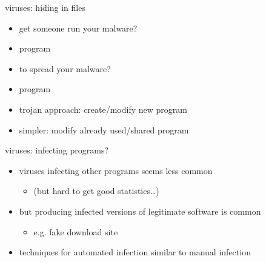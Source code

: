 
\begin{frame}{viruses: hiding in files}
    \begin{itemize}
    \item get someone run your malware?
    \item program 
    \vspace{.5cm}
    \item to spread your malware?
    \item program 
    \vspace{.5cm}
    \item trojan approach: create/modify new program
    \item simpler: modify already used/shared program
    \end{itemize}
\end{frame}

\begin{frame}{viruses: infecting programs?}
    \begin{itemize}
    \item viruses infecting other programs seems less common
        \begin{itemize}
        \item (but hard to get good statistics\ldots)
        \end{itemize}
    \vspace{.5cm}
    \item but producing infected versions of legitimate software is common
        \begin{itemize}
        \item e.g. fake download site
        \end{itemize}
    \item techniques for automated infection similar to manual infection
    \end{itemize}
\end{frame}
